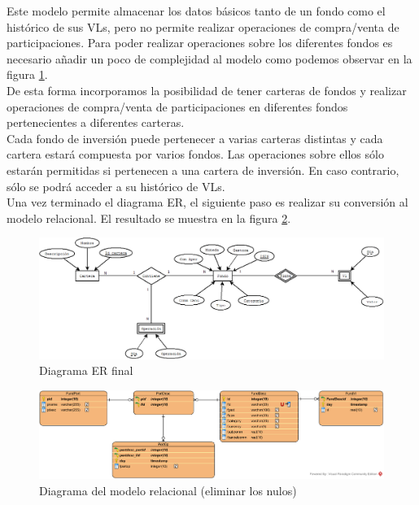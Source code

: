 \documentclass[12pt, a4paper]{book}
\begin{document}
Este modelo permite almacenar los datos básicos tanto de un fondo como el histórico de sus \gls{VL}s, pero no permite realizar operaciones de compra/venta de participaciones. Para poder realizar operaciones sobre los diferentes fondos es necesario añadir un poco de complejidad al modelo como podemos observar en la figura \ref{fig:erfinal}.\\




De esta forma incorporamos la posibilidad de tener carteras de fondos y realizar operaciones de compra/venta de participaciones en diferentes fondos pertenecientes a diferentes carteras.\\

Cada fondo de inversión puede pertenecer a varias carteras distintas y cada cartera estará compuesta por varios fondos. Las operaciones sobre ellos sólo estarán permitidas si pertenecen a una cartera de inversión. En caso contrario, sólo se podrá acceder a su histórico de \gls{VL}s.\\

Una vez terminado el diagrama \gls{ER}, el siguiente paso es realizar su conversión al modelo relacional. El resultado se muestra en la figura \ref{fig:relacional}.\\




\newpage
\begin{landscape}
	
\begin{figure}[]
	\centering
	\includegraphics[width=24cm]{figuras/ERCompleto.png}
	\caption{Diagrama ER final}
	\label{fig:erfinal}
	\end {figure}
		
	\end{landscape}
	\newpage


\newpage
\begin{landscape}

\begin{figure}[]
	\centering
	\includegraphics[width=24cm]{figuras/DiagramaR.png}
	\caption{Diagrama del modelo relacional (eliminar los nulos)}
	\label{fig:relacional}
\end {figure}
	
\end{landscape}
\newpage
\end{document}
